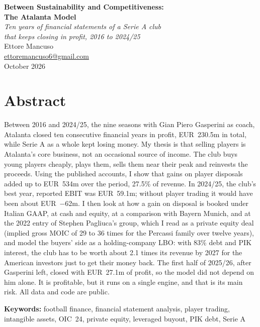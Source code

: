 \documentclass[11pt,a4paper]{article}
\begin{document}
\thispagestyle{empty}
\begin{center}
{\LARGE\bfseries Between Sustainability and Competitiveness:\\[4pt] The Atalanta Model}\\[10pt]
{\large\itshape Ten years of financial statements of a Serie A club\\ that keeps closing in profit, 2016 to 2024/25}\\[22pt]
{\large Ettore Mancuso}\\[1pt]
\href{mailto:ettoremancuso6@gmail.com}{ettoremancuso6@gmail.com}\\[1pt]
October 2026
\end{center}
\vspace{16pt}

\section*{Abstract}
Between 2016 and 2024/25, the nine seasons with Gian Piero Gasperini as coach, Atalanta closed ten consecutive financial years in profit, EUR~230.5m in total, while Serie A as a whole kept losing money. My thesis is that selling players is Atalanta's core business, not an occasional source of income. The club buys young players cheaply, plays them, sells them near their peak and reinvests the proceeds. Using the published accounts, I show that gains on player disposals added up to EUR~534m over the period, 27.5\% of revenue. In 2024/25, the club's best year, reported EBIT was EUR~59.1m; without player trading it would have been about EUR~−62m. I then look at how a gain on disposal is booked under Italian GAAP, at cash and equity, at a comparison with Bayern Munich, and at the 2022 entry of Stephen Pagliuca's group, which I read as a private equity deal (implied gross MOIC of 29 to 36 times for the Percassi family over twelve years), and model the buyers' side as a holding-company LBO: with 83\% debt and PIK interest, the club has to be worth about 2.1 times its revenue by 2027 for the American investors just to get their money back. The first half of 2025/26, after Gasperini left, closed with EUR~27.1m of profit, so the model did not depend on him alone. It is profitable, but it runs on a single engine, and that is its main risk. All data and code are public.

\medskip
\textbf{Keywords:} football finance, financial statement analysis, player trading, intangible assets, OIC~24, private equity, leveraged buyout, PIK debt, Serie A
\end{document}
